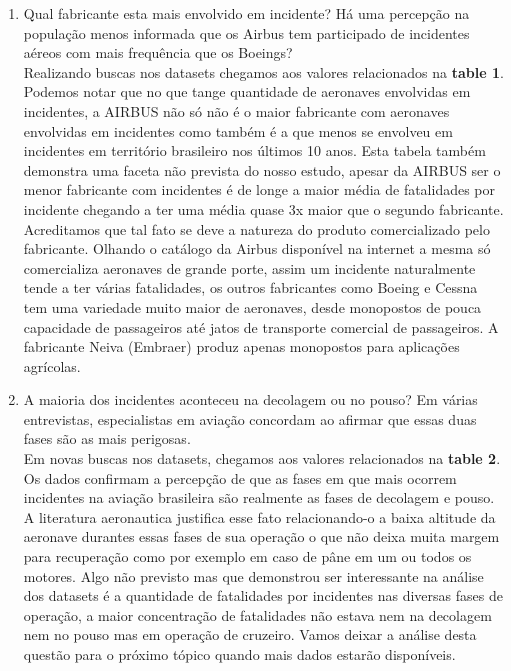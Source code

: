 \documentclass[conference]{IEEEtran}
\begin{document}
\begin{enumerate}
 \item Qual fabricante esta mais envolvido em incidente? Há uma percepção na população menos informada que os Airbus tem participado de incidentes aéreos com mais frequência
 que os Boeings?\\
 
 Realizando buscas nos datasets chegamos aos valores relacionados na \textbf{table 1}. Podemos notar que no que tange quantidade de aeronaves envolvidas em incidentes,
 a AIRBUS não só não é o maior fabricante com aeronaves envolvidas em incidentes como também é a que menos se envolveu em incidentes em território brasileiro nos últimos
 10 anos. Esta tabela também demonstra uma faceta não prevista do nosso estudo, apesar da AIRBUS ser o menor fabricante com incidentes é de longe a maior média de fatalidades 
 por incidente chegando a ter uma média quase 3x maior que o segundo fabricante. Acreditamos que tal fato se deve a natureza do produto comercializado pelo fabricante. 
 Olhando o catálogo da Airbus disponível na internet a mesma só comercializa aeronaves de grande porte, assim um incidente naturalmente tende a ter várias fatalidades,
 os outros fabricantes como Boeing e Cessna tem uma variedade muito maior de aeronaves, desde monopostos de pouca capacidade de passageiros até jatos de transporte comercial
 de passageiros. A fabricante Neiva (Embraer) produz apenas monopostos para aplicações agrícolas.\\
 
 \item A maioria dos incidentes aconteceu na decolagem ou no pouso? Em várias entrevistas, especialistas em aviação concordam ao afirmar que essas duas fases são as
 mais perigosas.\\
 
 Em novas buscas nos datasets, chegamos aos valores relacionados na \textbf{table 2}. Os dados confirmam a percepção de que as fases em que mais ocorrem incidentes na
 aviação brasileira são realmente as fases de decolagem e pouso. A literatura aeronautica justifica esse fato relacionando-o a baixa altitude da aeronave durantes essas
 fases de sua operação o que não deixa muita margem para recuperação como por exemplo em caso de pâne em um ou todos os motores. Algo não previsto mas que demonstrou ser
 interessante na análise dos datasets é a quantidade de fatalidades por incidentes nas diversas fases de operação, a maior concentração de fatalidades não estava nem na
 decolagem nem no pouso mas em operação de cruzeiro. Vamos deixar a análise desta questão para o próximo tópico quando mais dados estarão disponíveis.\\
 

\end{enumerate}
\end{document}
